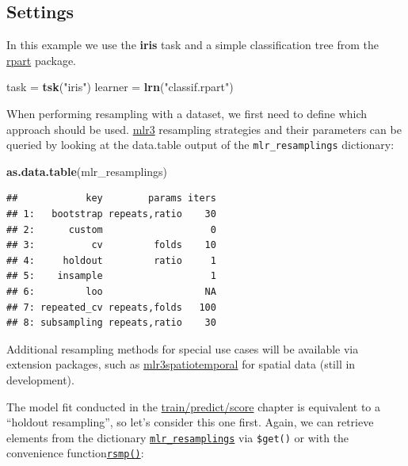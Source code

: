 \documentclass[]{scrbook}
\newenvironment{Shaded}{\begin{snugshade}}{\end{snugshade}}
\newcommand{\KeywordTok}[1]{\textcolor[rgb]{0.13,0.29,0.53}{\textbf{#1}}}
\newcommand{\NormalTok}[1]{#1}
\newcommand{\StringTok}[1]{\textcolor[rgb]{0.31,0.60,0.02}{#1}}
\renewenvironment{Shaded} {\begin{snugshade}\small} {\end{snugshade}}
\begin{document}
\hypertarget{resampling-settings}{%
\subsection{Settings}\label{resampling-settings}}

In this example we use the \textbf{iris} task and a simple classification tree from the \href{https://cran.r-project.org/package=rpart}{rpart} package.

\begin{Shaded}
\begin{Highlighting}[]
\NormalTok{task =}\StringTok{ }\KeywordTok{tsk}\NormalTok{(}\StringTok{"iris"}\NormalTok{)}
\NormalTok{learner =}\StringTok{ }\KeywordTok{lrn}\NormalTok{(}\StringTok{"classif.rpart"}\NormalTok{)}
\end{Highlighting}
\end{Shaded}

When performing resampling with a dataset, we first need to define which approach should be used.
\href{https://mlr3.mlr-org.com}{mlr3} resampling strategies and their parameters can be queried by looking at the data.table output of the \texttt{mlr\_resamplings} dictionary:

\begin{Shaded}
\begin{Highlighting}[]
\KeywordTok{as.data.table}\NormalTok{(mlr_resamplings)}
\end{Highlighting}
\end{Shaded}

\begin{verbatim}
##            key        params iters
## 1:   bootstrap repeats,ratio    30
## 2:      custom                   0
## 3:          cv         folds    10
## 4:     holdout         ratio     1
## 5:    insample                   1
## 6:         loo                  NA
## 7: repeated_cv repeats,folds   100
## 8: subsampling repeats,ratio    30
\end{verbatim}

Additional resampling methods for special use cases will be available via extension packages, such as \href{https://github.com/mlr-org/mlr3spatiotemporal}{mlr3spatiotemporal} for spatial data (still in development).

The model fit conducted in the \protect\hyperlink{train-predict}{train/predict/score} chapter is equivalent to a ``holdout resampling'', so let's consider this one first.
Again, we can retrieve elements from the dictionary \href{https://mlr3.mlr-org.com/reference/mlr_resamplings.html}{\texttt{mlr\_resamplings}} via \texttt{\$get()} or with the convenience function\href{https://mlr3.mlr-org.com/reference/mlr_sugar.html}{\texttt{rsmp()}}:
\end{document}
